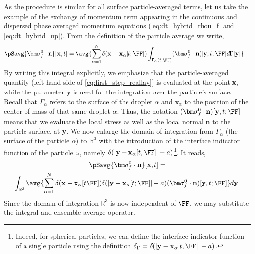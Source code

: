 As the procedure is similar for all surface particle-averaged terms, let us take the example of the exchange of momentum term appearing in the continuous and dispersed phase averaged momentum equations (\ref{eq:dt_hybrid_rhou_f} and \ref{eq:dt_hybrid_up}). 
From the definition of the particle average we write,
\begin{align}
    \pSavg{\bm\sigma_f^0\cdot\textbf{n}}[\textbf{x},t]
    &= \avg{ \sum_{\alpha=1}^N \delta(\textbf{x}-\textbf{x}_\alpha[t; \FF])
    \int_{\Gamma_\alpha(t,\FF)}
    (\bm\sigma_f^0\cdot\textbf{n})[\textbf{y},t;\FF]
    d\Gamma[\textbf{y}] }
    \label{eq:first_step_reallay}
\end{align}
By writing this integral explicitly, we emphasize that the particle-averaged quantity (left-hand side of \ref{eq:first_step_reallay}) is evaluated at the point \textbf{x}, while the parameter $\textbf{y}$ is used for the integration over the particle's surface.
Recall that $\Gamma_\alpha$ refers to the surface of the droplet $\alpha$ and $\textbf{x}_\alpha$ to the position of the center of mass of that same droplet $\alpha$. 
Thus, the notation $(\bm\sigma_f^0\cdot\textbf{n})[\textbf{y},t;\FF]$ means that we evaluate the local stress as well as the local normal $\textbf{n}$ to the particle surface, at \textbf{y}. 
We now enlarge the domain of integration from $\Gamma_\alpha$ (the surface of the particle $\alpha$) to $\mathbb{R}^3$ with the introduction of the interface indicator function of the particle $\alpha$, namely $\delta(|\textbf{y} - \textbf{x}_\alpha[t,\FF]| - a)$\footnote{Indeed, for spherical particles, we can define the interface indicator function of a single particle using the definition $\delta_\Gamma = \delta(|\textbf{y} - \textbf{x}_\alpha[t,\FF]| - a)$.}. 
It reads,
\begin{multline}
    \pSavg{\bm\sigma_f^0\cdot\textbf{n}}[\textbf{x},t]
    = \\
    \int_{\mathbb{R}^3}
    \avg{
     \sum_{\alpha=1}^N 
     \delta(\textbf{x}-\textbf{x}_\alpha[t \FF])
    \delta(|\textbf{y} - \textbf{x}_{\alpha}[t;\FF]|-a)
    (\bm\sigma_f^0\cdot\textbf{n})[\textbf{y},t;\FF]
    }
    d\textbf{y}. 
    \label{eq:first_step_drag}
\end{multline} 
Since the domain of integration $\mathbb{R}^3$ is now independent of $\FF$, we may substitute the integral and ensemble average operator. 

